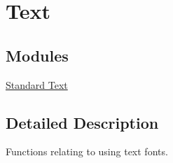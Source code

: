 \hypertarget{group___text}{}\section{Text}
\label{group___text}
\subsection*{Modules}
\begin{DoxyCompactItemize}
\item 
\hyperlink{group___standard_text}{Standard Text}
\end{DoxyCompactItemize}


\subsection{Detailed Description}
Functions relating to using text fonts. 